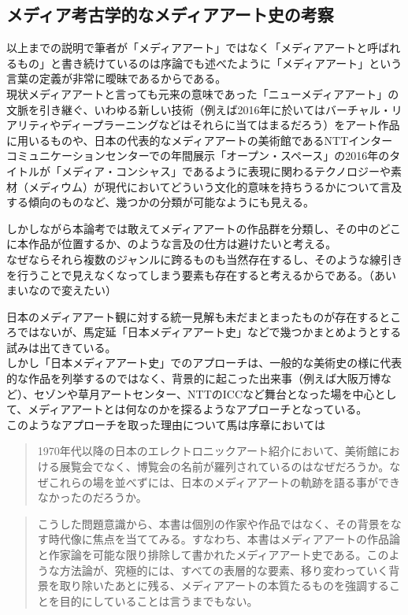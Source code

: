 \subsection{メディア考古学的なメディアアート史の考察}\label{ux30e1ux30c7ux30a3ux30a2ux8003ux53e4ux5b66ux7684ux306aux30e1ux30c7ux30a3ux30a2ux30a2ux30fcux30c8ux53f2ux306eux8003ux5bdf}

以上までの説明で筆者が「メディアアート」ではなく「メディアアートと呼ばれるもの」と書き続けているのは序論でも述べたように「メディアアート」という言葉の定義が非常に曖昧であるからである。\\
現状メディアアートと言っても元来の意味であった「ニューメディアアート」の文脈を引き継ぐ、いわゆる新しい技術（例えば2016年に於いてはバーチャル・リアリティやディープラーニングなどはそれらに当てはまるだろう）をアート作品に用いるものや、日本の代表的なメディアアートの美術館であるNTTインターコミュニケーションセンターでの年間展示「オープン・スペース」の2016年のタイトルが「メディア・コンシャス」であるように表現に関わるテクノロジーや素材（メディウム）が現代においてどういう文化的意味を持ちうるかについて言及する傾向のものなど、幾つかの分類が可能なようにも見える。

しかしながら本論考では敢えてメディアアートの作品群を分類し、その中のどこに本作品が位置するか、のような言及の仕方は避けたいと考える。\\
なぜならそれら複数のジャンルに跨るものも当然存在するし、そのような線引きを行うことで見えなくなってしまう要素も存在すると考えるからである。（あいまいなので変えたい）

日本のメディアアート観に対する統一見解も未だまとまったものが存在するところではないが、馬定延「日本メディアアート史」などで幾つかまとめようとする試みは出てきている。\\
しかし「日本メディアアート史」でのアプローチは、一般的な美術史の様に代表的な作品を列挙するのではなく、背景的に起こった出来事（例えば大阪万博など）、セゾンや草月アートセンター、NTTのICCなど舞台となった場を中心として、メディアアートとは何なのかを探るようなアプローチとなっている。\\
このようなアプローチを取った理由について馬は序章においては

\begin{quote}
1970年代以降の日本のエレクトロニックアート紹介において、美術館における展覧会でなく、博覧会の名前が羅列されているのはなぜだろうか。なぜこれらの場を並べずには、日本のメディアアートの軌跡を語る事ができなかったのだろうか。
\end{quote}

\begin{quote}
こうした問題意識から、本書は個別の作家や作品ではなく、その背景をなす時代像に焦点を当ててみる。すなわち、本書はメディアアートの作品論と作家論を可能な限り排除して書かれたメディアアート史である。このような方法論が、究極的には、すべての表層的な要素、移り変わっていく背景を取り除いたあとに残る、メディアアートの本質たるものを強調することを目的にしていることは言うまでもない。
\end{quote}

